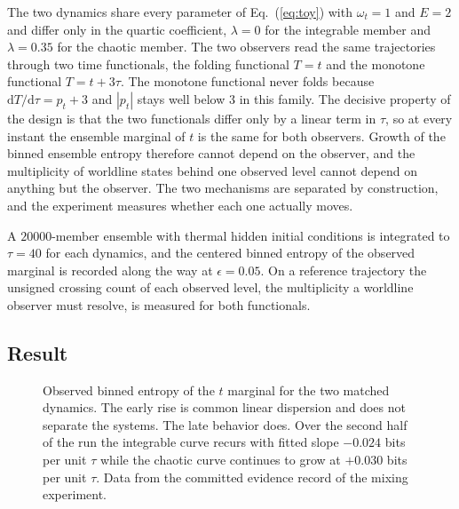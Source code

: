 \documentclass[aps,pre,reprint,nofootinbib]{revtex4-2}
\newcommand{\dd}{\mathrm{d}}
\begin{document}
The two dynamics share every parameter of Eq.~(\ref{eq:toy}) with
$\omega_t = 1$ and $E = 2$ and differ only in the quartic coefficient,
$\lambda = 0$ for the integrable member and $\lambda = 0.35$ for the
chaotic member.  The two observers read the same trajectories through two
time functionals, the folding functional $T = t$ and the monotone
functional $T = t + 3\tau$.  The monotone functional never folds because
$\dd T/\dd\tau = p_t + 3$ and $|p_t|$ stays well below $3$ in this family.
The decisive property of the design is that the two functionals differ
only by a linear term in $\tau$, so at every instant the ensemble marginal
of $t$ is the same for both observers.  Growth of the binned ensemble
entropy therefore cannot depend on the observer, and the multiplicity of
worldline states behind one observed level cannot depend on anything but
the observer.  The two mechanisms are separated by construction, and the
experiment measures whether each one actually moves.

A $20000$-member ensemble with thermal hidden initial conditions is
integrated to $\tau = 40$ for each dynamics, and the centered binned
entropy of the observed marginal is recorded along the way at
$\epsilon = 0.05$.  On a reference trajectory the unsigned crossing count
of each observed level, the multiplicity a worldline observer must
resolve, is measured for both functionals.

\subsection{Result}

\begin{figure}[t]
\caption{Observed binned entropy of the $t$ marginal for the two matched
dynamics.  The early rise is common linear dispersion and does not
separate the systems.  The late behavior does.  Over the second half of
the run the integrable curve recurs with fitted slope $-0.024$ bits per
unit $\tau$ while the chaotic curve continues to grow at $+0.030$ bits
per unit $\tau$.  Data from the committed evidence record of the mixing
experiment.}
\label{fig:pe3}
\end{figure}
\end{document}
